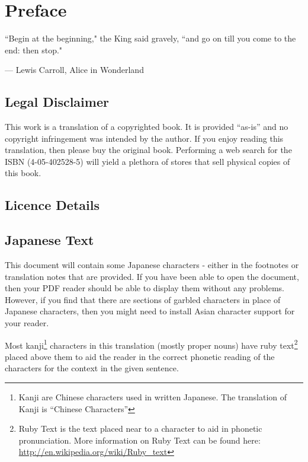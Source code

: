 
\chapter*{Preface}

\epigraph{``Begin at the beginning," the King said gravely, ``and go on till you come to the end: then stop."}{--- \textup{Lewis Carroll}, Alice in Wonderland}

\section*{Legal Disclaimer}
This work is a translation of a copyrighted book. It is provided ``as-is'' and no copyright infringement was intended by the author. If you enjoy reading this translation, then please buy the original book. Performing a web search for the ISBN (4-05-402528-5) will yield a plethora of stores that sell physical copies of this book.

\section*{Licence Details}


\section*{Japanese Text}
This document will contain some Japanese characters - either in the footnotes or translation notes that are provided. If you have been able to open the document, then your PDF reader should be able to display them without any problems. However, if you find that there are sections of garbled characters in place of Japanese characters, then you might need to install Asian character support for your reader.

\par Most kanji\footnote{Kanji are Chinese characters used in written Japanese. The translation of Kanji is ``Chinese Characters''} characters in this translation (mostly proper nouns) have ruby text\footnote{Ruby Text is the text placed near to a character to aid in phonetic pronunciation. More information on Ruby Text can be found here: \url{http://en.wikipedia.org/wiki/Ruby_text}} placed above them to aid the reader in the correct phonetic reading of the characters for the context in the given sentence.

